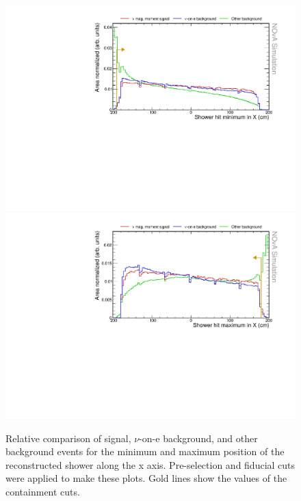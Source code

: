 \begin{figure}[hbtp]
\centering
\includegraphics[width=.9\textwidth]{Plots/NuMMEventSelection/N1Cut_minX.pdf}
\includegraphics[width=.9\textwidth]{Plots/NuMMEventSelection/N1Cut_maxX.pdf}
\caption{Relative comparison of signal, $\nu$-on-e background, and other background events for the minimum and maximum position of the reconstructed shower along the x axis. Pre-selection and fiducial cuts were applied to make these plots. Gold lines show the values of the containment cuts.}
\label{fig:ContainmentCutsX}
\end{figure}

